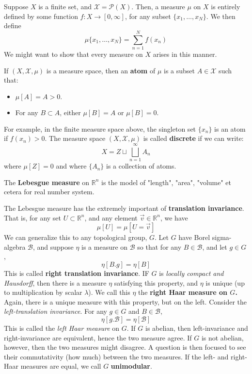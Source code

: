 \begin{example}
    Suppose $X$ is a finite set, and $\mathcal{X}=\mathcal{P}(X)$. Then, a measure $\mu$ on $X$ is entirely defined by some function $f:X\to[0,\infty]$, for any subset $\{ x_{1},\dots,x_{N} \}$. We then define $$\mu \{ x_{1},\dots,x_{N} \} = \sum^{N}_{n=1}f(x_{n})$$
We might want to show that every measure on $X$ arises in this manner. 
\end{example}
\begin{example}
    If $(X,\mathcal{X},\mu)$ is a measure space, then an \textbf{atom} of $\mu$ is a subset $A\in\mathcal{X}$ such that: 
\begin{itemize}[noitemsep,topsep=2pt]
    \item $\mu[A]=A>0$. 
    \item For any $B\subset A$, either $\mu[B]=A$ or $\mu[B]=0$. 
\end{itemize}
For example, in the finite measure space above, the singleton set $\{ x_{n} \}$ is an atom if $f(x_{n})>0$. The measure space $(X,\mathcal{X},\mu)$ is called \textbf{discrete} if we can write: $$X=Z\sqcup \bigsqcup^{\infty}_{n=1}A_{n}$$
where $\mu[Z]=0$ and where $\{ A_{n} \}$ is a collection of atoms. 
\end{example}
\begin{example}
    The \textbf{Lebesgue measure} on $\mathbb{R}^{n}$ is the model of "length", "area", "volume" et cetera for real number system. 
\end{example}
\begin{example}
    The Lebesgue measure has the extremely important of \textbf{translation invariance}. That is, for any set $U\subset \mathbb{R}^{n}$, and any element $\vec{v}\in \mathbb{R}^{n}$, we have $$\mu[U]=\mu[U=\vec{v}]$$
We can generalize this to any topological group, $G$. Let $G$ have Borel sigma-algebra $\mathcal{B}$, and suppose $\eta$ is a measure on $\mathcal{B}$ so that for any $B\in\mathcal{B}$, and let $g\in G$, $$\eta[B.g]=\eta[B]$$
This is called \textbf{right translation invariance}. IF $G$ is \textit{locally compact and Hausdorff}, then there is a measure $\eta$ satisfying this property, and $\eta$ is unique (up to multiplication by scalar $\lambda$). We call this $\eta$ the \textbf{right Haar measure on $G$.} Again, there is a unique measure with this property, but on the left. Consider the \textit{left-translation invariance}. For any $g\in G$ and $B\in\mathcal{B}$, $$\eta[g.\mathcal{B}]=\eta[\mathcal{B}]$$
This is called the \textit{left Haar measure} on $G$. If $G$ is abelian, then left-invariance and right-invariance are equivalent, hence the two measure agree. If $G$ is not abelian, however, then the two measures might disagree. A question is then focused to see their commutativity (how much) between the two measures. If the left- and right- Haar measures are equal, we call $G$ \textbf{unimodular}. 
\end{example}

